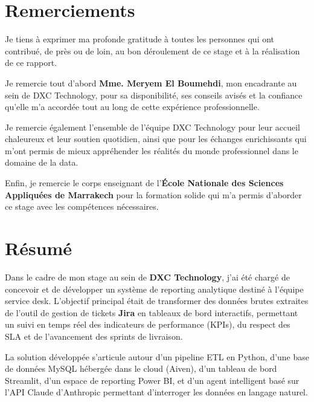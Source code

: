 \documentclass[12pt, a4paper]{report}
\begin{document}
\chapter*{Remerciements}

Je tiens à exprimer ma profonde gratitude à toutes les personnes qui ont contribué, de près ou de loin, au bon déroulement de ce stage et à la réalisation de ce rapport.

Je remercie tout d'abord \textbf{Mme. Meryem El Boumehdi}, mon encadrante au sein de DXC Technology, pour sa disponibilité, ses conseils avisés et la confiance qu'elle m'a accordée tout au long de cette expérience professionnelle.

Je remercie également l'ensemble de l'équipe DXC Technology pour leur accueil chaleureux et leur soutien quotidien, ainsi que pour les échanges enrichissants qui m'ont permis de mieux appréhender les réalités du monde professionnel dans le domaine de la data.

Enfin, je remercie le corps enseignant de l'\textbf{École Nationale des Sciences Appliquées de Marrakech} pour la formation solide qui m'a permis d'aborder ce stage avec les compétences nécessaires.

\newpage

\chapter*{Résumé}

Dans le cadre de mon stage au sein de \textbf{DXC Technology}, j'ai été chargé de concevoir et de développer un système de reporting analytique destiné à l'équipe service desk. L'objectif principal était de transformer des données brutes extraites de l'outil de gestion de tickets \textbf{Jira} en tableaux de bord interactifs, permettant un suivi en temps réel des indicateurs de performance (KPIs), du respect des SLA et de l'avancement des sprints de livraison.

La solution développée s'articule autour d'un pipeline ETL en Python, d'une base de données MySQL hébergée dans le cloud (Aiven), d'un tableau de bord Streamlit, d'un espace de reporting Power BI, et d'un agent intelligent basé sur l'API Claude d'Anthropic permettant d'interroger les données en langage naturel.
\end{document}
